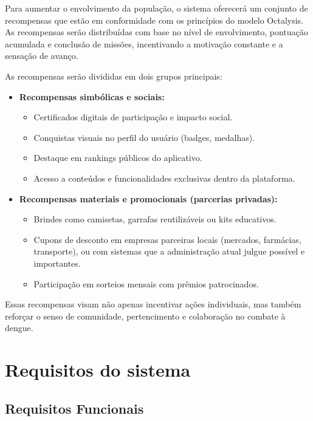 \documentclass[a5paper, 12pt]{article}
\begin{document}
Para aumentar o envolvimento da população, o sistema oferecerá um conjunto de recompensas que estão em conformidade com os princípios do modelo Octalysis. As recompensas serão distribuídas com base no nível de envolvimento, pontuação acumulada e conclusão de missões, incentivando a motivação constante e a sensação de avanço.

As recompensas serão divididas em dois grupos principais:

\begin{itemize}
    \item \textbf{Recompensas simbólicas e sociais:}
    \begin{itemize}
        \item Certificados digitais de participação e impacto social.
        \item Conquistas visuais no perfil do usuário (badges, medalhas).
        \item Destaque em rankings públicos do aplicativo.
        \item Acesso a conteúdos e funcionalidades exclusivas dentro da plataforma.
    \end{itemize}

    \item \textbf{Recompensas materiais e promocionais (parcerias privadas):}
    \begin{itemize}
        \item Brindes como camisetas, garrafas reutilizáveis ou kits educativos.
        \item Cupons de desconto em empresas parceiras locais (mercados, farmácias, transporte), ou com sistemas que a administração atual julgue possível e importantes.
        \item Participação em sorteios mensais com prêmios patrocinados.
    \end{itemize}
\end{itemize}

Essas recompensas visam não apenas incentivar ações individuais, mas também reforçar o senso de comunidade, pertencimento e colaboração no combate à dengue.

\section{Requisitos do sistema}
    \subsection{Requisitos Funcionais}
    \label{sec:req}
    
\end{document}
